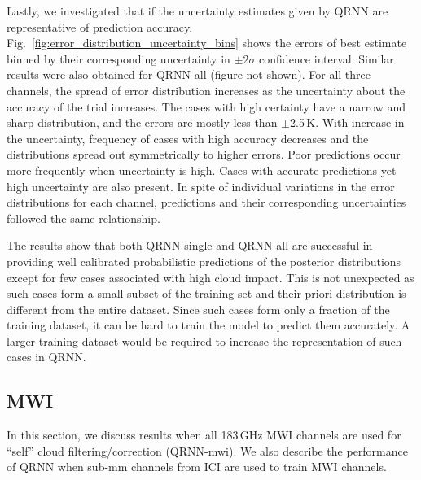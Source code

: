 \documentclass[amt, manuscript]{copernicus}
\begin{document}
Lastly, we investigated that if the uncertainty estimates given by QRNN are representative of prediction accuracy. Fig.~\ref{fig:error_distribution_uncertainty_bins} shows the errors of best estimate binned by their corresponding uncertainty in $\pm2\sigma$  confidence interval. Similar results were also obtained for QRNN-all (figure not shown). For all three channels, the spread of error distribution increases as the uncertainty about the accuracy of the trial increases. The cases with high certainty have a narrow and sharp distribution, and the errors are mostly less than $\pm$2.5\,K. With increase in the uncertainty, frequency of cases with high accuracy decreases and the distributions spread out symmetrically to higher errors. Poor predictions occur more frequently when uncertainty is high. Cases with accurate predictions yet high uncertainty are also present. In spite of individual variations in the error distributions for each channel, predictions and their corresponding uncertainties followed the same relationship.

The results show that both QRNN-single and QRNN-all are successful in providing well calibrated probabilistic predictions of the posterior distributions except for few cases associated with high cloud impact. This is not unexpected as such cases form a small subset of the training set and their priori distribution is different from the entire dataset. Since such cases form only a fraction of the training dataset, it can be hard to train the model to predict them accurately. A larger training dataset would be required to increase the representation of such cases in QRNN.

\subsection{MWI}
%
In this section, we discuss results when all 183\,GHz MWI channels are used for ``self'' cloud filtering/correction (QRNN-mwi). We also describe the performance of QRNN when sub-mm channels from ICI are used to train MWI channels.
\end{document}
